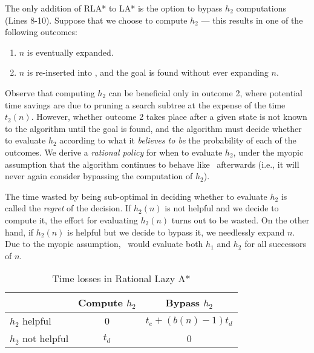The only addition of RLA* to LA* is the option to bypass $h_2$ computations (Lines 8-10).
Suppose that we choose to compute $h_2$ --- this results in one of the
following outcomes:
\begin{enumerate}
\item $n$ is eventually expanded.
\item $n$ is re-inserted into \OPEN, and the goal is found without ever expanding $n$.
\end{enumerate}

Observe that computing $h_2$ can be beneficial only in outcome 2, where
potential time savings are due to pruning a search subtree at the expense of
the time $t_2(n)$. However, whether outcome 2 takes place after a given state
is not known to the algorithm until the goal is found, and the algorithm must
decide whether to evaluate $h_2$ according to what it \textit{believes to be}
the probability of each of the outcomes. We derive a \textit{rational policy}
for when to evaluate $h_2$, under the myopic assumption that the algorithm
continues to behave like \lazyastar~afterwards (i.e., it will never again
consider bypassing the computation of $h_2$).

The time wasted by being sub-optimal in deciding whether to evaluate $h_2$ is
called the {\em regret} of the decision. If $h_2(n)$ is not helpful and we decide to compute it, the effort for evaluating $h_2(n)$ turns out to be wasted. On the other hand, if $h_2(n)$ is helpful but we decide to bypass it, we needlessly expand $n$. Due to the myopic assumption, \rationallazyastar~would evaluate both $h_1$ and $h_2$ for all successors of
$n$.

\begin{table}[h!]
\begin{center}
\begin{tabular}{|l|c|c|}
\hline
               & Compute $h_2$ & Bypass $h_2$\\
\hline
$h_2$ helpful &   0            & $t_e+(b(n)-1)t_d$\\
\hline
$h_2$ not helpful & $t_d$      & 0 \\
\hline
\end{tabular}
\end{center}
\caption{Time losses in Rational Lazy A*}
\label{tbl:rla-rational-lazy-a-time}
\end{table}

